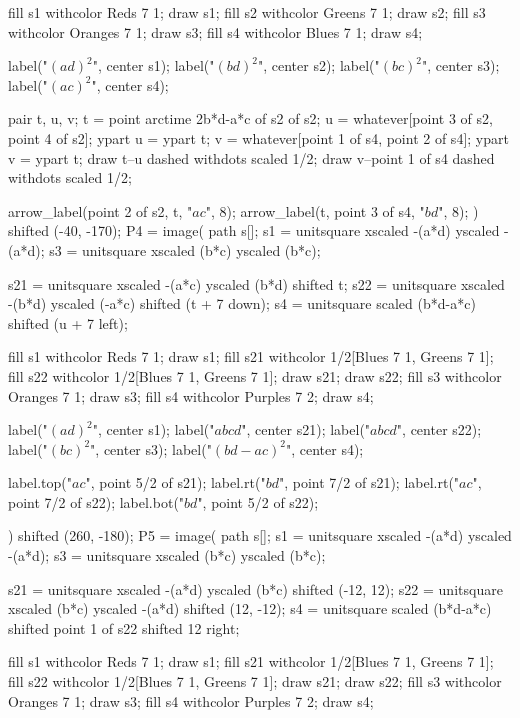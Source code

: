 \documentclass[oneside]{scrbook}
\begin{document}
    fill s1 withcolor Reds 7 1;     draw s1;
    fill s2 withcolor Greens 7 1;   draw s2;
    fill s3 withcolor Oranges 7 1;  draw s3;
    fill s4 withcolor Blues 7 1;    draw s4;

    label("$\left(ad\right)^2$", center s1);
    label("$\left(bd\right)^2$", center s2);
    label("$\left(bc\right)^2$", center s3);
    label("$\left(ac\right)^2$", center s4);

    pair t, u, v;
    t = point arctime 2b*d-a*c of s2 of s2;
    u = whatever[point 3 of s2, point 4 of s2]; ypart u = ypart t;
    v = whatever[point 1 of s4, point 2 of s4]; ypart v = ypart t;
    draw t--u dashed withdots scaled 1/2;
    draw v--point 1 of s4 dashed withdots scaled 1/2;

    arrow_label(point 2 of s2, t, "$ac$", 8);
    arrow_label(t, point 3 of s4, "$bd$", 8);
) shifted (-40, -170);
P4 = image(
    path s[];
    s1 = unitsquare xscaled -(a*d) yscaled -(a*d);
    s3 = unitsquare xscaled  (b*c) yscaled (b*c);

    s21 = unitsquare xscaled -(a*c) yscaled (b*d) shifted t;
    s22 = unitsquare xscaled -(b*d) yscaled (-a*c) shifted (t + 7 down);
    s4 = unitsquare scaled (b*d-a*c) shifted (u + 7 left);

    fill s1 withcolor Reds 7 1;     draw s1;
    fill s21 withcolor 1/2[Blues 7 1, Greens 7 1];
    fill s22 withcolor 1/2[Blues 7 1, Greens 7 1];
    draw s21; draw s22;
    fill s3 withcolor Oranges 7 1;  draw s3;
    fill s4 withcolor Purples 7 2;    draw s4;

    label("$\left(ad\right)^2$", center s1);
    label("$abcd$", center s21);
    label("$abcd$", center s22);
    label("$\left(bc\right)^2$", center s3);
    label("$\scriptstyle \left(bd-ac\right)^2$", center s4);

    label.top("$ac$", point 5/2 of s21);
    label.rt("$bd$", point 7/2 of s21);
    label.rt("$ac$", point 7/2 of s22);
    label.bot("$bd$", point 5/2 of s22);

) shifted (260, -180);
P5 = image(
    path s[];
    s1 = unitsquare xscaled -(a*d) yscaled -(a*d);
    s3 = unitsquare xscaled  (b*c) yscaled (b*c);

    s21 = unitsquare xscaled -(a*d) yscaled (b*c) shifted (-12, 12);
    s22 = unitsquare xscaled (b*c) yscaled -(a*d) shifted (12, -12);
    s4 = unitsquare scaled (b*d-a*c) shifted point 1 of s22 shifted 12 right;

    fill s1 withcolor Reds 7 1;     draw s1;
    fill s21 withcolor 1/2[Blues 7 1, Greens 7 1];
    fill s22 withcolor 1/2[Blues 7 1, Greens 7 1];
    draw s21; draw s22;
    fill s3 withcolor Oranges 7 1;  draw s3;
    fill s4 withcolor Purples 7 2;  draw s4;
\end{document}
